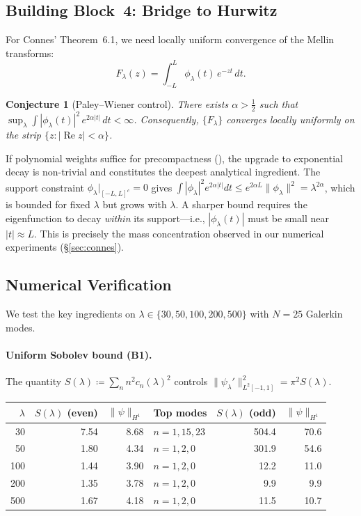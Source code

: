 \documentclass[12pt,a4paper]{article}
\newtheorem{conjecture}[theorem]{Conjecture}
\theoremstyle{definition}
\theoremstyle{remark}
\begin{document}
\subsection{Building Block~4: Bridge to Hurwitz}

For Connes' Theorem~6.1, we need locally uniform convergence of the Mellin transforms:
\[
  F_\lambda(z) = \int_{-L}^{L} \phi_\lambda(t)\,e^{-zt}\,dt.
\]

\begin{conjecture}[Paley--Wiener control]
\label{conj:pw}
There exists $\alpha > \tfrac{1}{2}$ such that $\sup_\lambda \int |\phi_\lambda(t)|^2\,e^{2\alpha|t|}\,dt < \infty$. Consequently, $\{F_\lambda\}$ converges locally uniformly on the strip $\{z : |\operatorname{Re} z| < \alpha\}$.
\end{conjecture}

If polynomial weights suffice for precompactness (), the upgrade to exponential decay is non-trivial and constitutes the deepest analytical ingredient. The support constraint $\phi_\lambda|_{[-L,L]^c} = 0$ gives $\int |\phi_\lambda|^2 e^{2\alpha|t|} dt \leq e^{2\alpha L}\|\phi_\lambda\|^2 = \lambda^{2\alpha}$, which is bounded for fixed $\lambda$ but grows with $\lambda$. A sharper bound requires the eigenfunction to decay \emph{within} its support---i.e., $|\phi_\lambda(t)|$ must be small near $|t| \approx L$. This is precisely the mass concentration observed in our numerical experiments (\S\ref{sec:connes}).

\subsection{Numerical Verification}
\label{sec:wc-numerics}

We test the key ingredients on $\lambda \in \{30, 50, 100, 200, 500\}$ with $N = 25$ Galerkin modes.

\paragraph{Uniform Sobolev bound (B1).}
The quantity $S(\lambda) \coloneqq \sum_{n} n^2 c_n(\lambda)^2$ controls $\|\psi_\lambda'\|_{L^2[-1,1]}^2 = \pi^2 S(\lambda)$.

\begin{center}
\renewcommand{\arraystretch}{1.15}
\begin{tabular}{r|r|r|l||r|r}
$\lambda$ & $S(\lambda)$ (even) & $\|\psi\|_{H^1}$ & Top modes & $S(\lambda)$ (odd) & $\|\psi\|_{H^1}$ \\\hline
30  & 7.54  & 8.68  & $n = 1,15,23$ & 504.4  & 70.6 \\
50  & 1.80  & 4.34  & $n = 1,2,0$   & 301.9  & 54.6 \\
100 & 1.44  & 3.90  & $n = 1,2,0$   & 12.2   & 11.0 \\
200 & 1.35  & 3.78  & $n = 1,2,0$   & 9.9    & 9.9  \\
500 & 1.67  & 4.18  & $n = 1,2,0$   & 11.5   & 10.7
\end{tabular}
\end{center}
\end{document}
